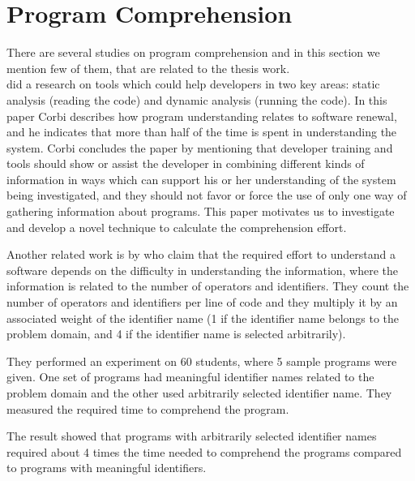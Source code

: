 \documentclass[12pt,mscthesis]{usiinfthesis}
\begin{document}
\section{Program Comprehension}
	There are several studies on program comprehension and in this section we mention few of them, that are related to the thesis work. \\


	\citet{Corbi:1989:PUC:97118.97124} did a research on tools which could help developers in two key areas: static analysis (reading the code) and dynamic analysis (running the code). In this paper Corbi describes how program understanding relates to software renewal, and he indicates that more than half of the time is spent in understanding the system. Corbi concludes the paper by mentioning that developer training and tools should show or assist the developer in combining  different kinds of information in ways which can support his or her understanding of the system being investigated, and they should not favor or force the use of only one way of gathering information about programs.
	This paper motivates us to investigate and develop a novel technique to calculate the comprehension effort.
	\newpage

	Another related work is by \citet{Kushwaha:2006:ICI:1163514.1163533}  who claim that the required effort to understand a software depends on the difficulty in understanding the information, where the information is related to the number of operators and identifiers. They count the number of operators and identifiers per line of code and they multiply it by an associated weight of the identifier name (1 if the identifier name belongs to the problem domain, and 4 if the identifier name is selected arbitrarily). 


	They performed an experiment on 60 students, where 5 sample programs were given. One set of programs had meaningful identifier names related to the problem domain and the other used arbitrarily selected identifier name. They measured the required time to comprehend the program.


	The result showed that programs with arbitrarily selected identifier names required about 4 times the time needed to comprehend the programs compared to programs with meaningful identifiers.\\
\end{document}
